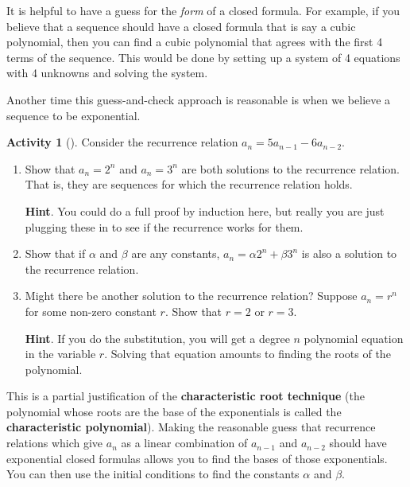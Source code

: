 \documentclass[10pt,]{book}
\newcommand{\terminology}[1]{\textbf{#1}}
\theoremstyle{plain}
\theoremstyle{definition}
\theoremstyle{definition}
\theoremstyle{definition}
\newtheorem{activity}[project]{Activity}
\theoremstyle{definition}
\numberwithin{equation}{chapter}
\begin{document}
\hypertarget{p-850}{}%
It is helpful to have a guess for the \emph{form} of a closed formula.  For example, if you believe that a sequence should have a closed formula that is say a cubic polynomial, then you can find a cubic polynomial that agrees with the first 4 terms of the sequence.  This would be done by setting up a system of 4 equations with 4 unknowns and solving the system.%
\par
\hypertarget{p-851}{}%
Another time this guess-and-check approach is reasonable is when we believe a sequence to be exponential.%
\begin{activity}[]\label{activity-91}
\hypertarget{p-852}{}%
Consider the recurrence relation \(a_n = 5a_{n-1} - 6a_{n-2}\).%
\begin{enumerate}[font=\bfseries,label=(\alph*),ref=\alph*]
\item\label{task-111} \hypertarget{p-853}{}%
Show that \(a_n = 2^n\) and \(a_n = 3^n\) are both solutions to the recurrence relation.  That is, they are sequences for which the recurrence relation holds.%
\par\smallskip%
\noindent\textbf{Hint}.\hypertarget{hint-83}{}\quad%
\hypertarget{p-854}{}%
You could do a full proof by induction here, but really you are just plugging these in to see if the recurrence works for them.%
\item\label{task-112} \hypertarget{p-855}{}%
Show that if \(\alpha\) and \(\beta\) are any constants, \(a_n = \alpha 2^n + \beta 3^n\) is also a solution to the recurrence relation.%
\item\label{task-113} \hypertarget{p-856}{}%
Might there be another solution to the recurrence relation?  Suppose \(a_n = r^n\) for some non-zero constant \(r\).  Show that \(r = 2\) or \(r = 3\).%
\par\smallskip%
\noindent\textbf{Hint}.\hypertarget{hint-84}{}\quad%
\hypertarget{p-857}{}%
If you do the substitution, you will get a degree \(n\) polynomial equation in the variable \(r\).  Solving that equation amounts to finding the roots of the polynomial.%
\end{enumerate}
\end{activity}
\hypertarget{p-858}{}%
This is a partial justification of the \terminology{characteristic root technique} (the polynomial whose roots are the base of the exponentials is called the \terminology{characteristic polynomial}).  Making the reasonable guess that recurrence relations which give \(a_n\) as a linear combination of \(a_{n-1}\) and \(a_{n-2}\) should have exponential closed formulas allows you to find the bases of those exponentials.  You can then use the initial conditions to find the constants \(\alpha\) and \(\beta\).%
\end{document}
